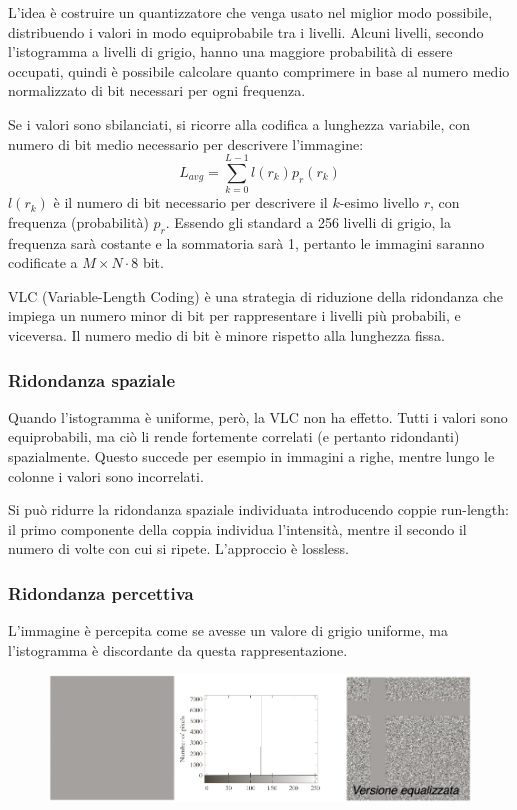 L'idea è costruire un quantizzatore che venga usato nel miglior modo possibile, distribuendo i valori in modo equiprobabile tra i livelli. Alcuni livelli, secondo l'istogramma a livelli di grigio, hanno una maggiore probabilità di essere occupati, quindi è possibile calcolare quanto comprimere in base al numero medio normalizzato di bit necessari per ogni frequenza.

Se i valori sono sbilanciati, si ricorre alla codifica a lunghezza variabile, con numero di bit medio necessario per descrivere l'immagine:
$$L_{avg} = \sum_{k=0}^{L-1}l(r_k)p_r(r_k)$$
$l(r_k)$ è il numero di bit necessario per descrivere il $k$-esimo livello $r$, con frequenza (probabilità) $p_r$. Essendo gli standard a 256 livelli di grigio, la frequenza sarà costante e la sommatoria sarà 1, pertanto le immagini saranno codificate a $M\times N \cdot 8$ bit.

VLC (Variable-Length Coding) è una strategia di riduzione della ridondanza che impiega un numero minor di bit per rappresentare i livelli più probabili, e viceversa. Il numero medio di bit è minore rispetto alla lunghezza fissa.

\subsubsection{Ridondanza spaziale}
Quando l'istogramma è uniforme, però, la VLC non ha effetto. Tutti i valori sono equiprobabili, ma ciò li rende fortemente correlati (e pertanto ridondanti) spazialmente. Questo succede per esempio in immagini a righe, mentre lungo le colonne i valori sono incorrelati.

Si può ridurre la ridondanza spaziale individuata introducendo coppie run-length: il primo componente della coppia individua l'intensità, mentre il secondo il numero di volte con cui si ripete. L'approccio è lossless.

\subsubsection{Ridondanza percettiva}
L'immagine è percepita come se avesse un valore di grigio uniforme, ma l'istogramma è discordante da questa rappresentazione.

\begin{figure}[h]
	\centering
	\includegraphics[scale=0.4]{Lezioni/Immagini/ridondanzapercettiva}
\end{figure}

